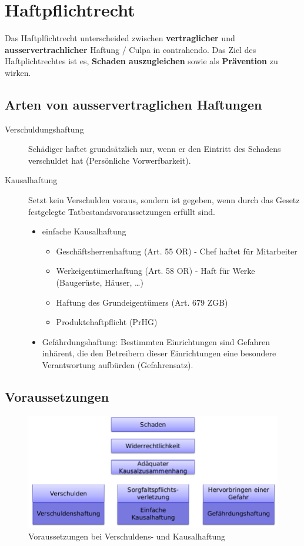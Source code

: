 \section{Haftpflichtrecht}

Das Haftplfichtrecht unterscheided zwischen \textbf{vertraglicher} und
\textbf{ausservertrachlicher} Haftung / Culpa in contrahendo. Das Ziel des
Haftplichtrechtes ist es, \textbf{Schaden auszugleichen} sowie als
\textbf{Prävention} zu wirken.


\subsection{Arten von ausservertraglichen Haftungen}

\begin{description}
	\item[Verschuldungshaftung] Schädiger haftet grundsätzlich nur, wenn
	er den Eintritt des Schadens verschuldet hat (Persönliche
	Vorwerfbarkeit).
	\item[Kausalhaftung] Setzt kein Verschulden voraus, sondern ist
	gegeben, wenn durch das Gesetz festgelegte Tatbestandsvoraussetzungen
	erfüllt sind.
	\begin{itemize}
		\tightlist
		\item einfache Kausalhaftung
		\begin{itemize}
			\tightlist
			\item Geschäftsherrenhaftung (Art. 55 OR) - Chef haftet für Mitarbeiter
			\item Werkeigentümerhaftung (Art. 58 OR) - Haft für Werke (Baugerüste,
			Häuser, \ldots{})
			\item Haftung des Grundeigentümers (Art. 679 ZGB)
			\item Produktehaftpflicht (PrHG)
		\end{itemize}
		\item Gefährdungshaftung: Bestimmten Einrichtungen sind Gefahren inhärent,
		die den Betreibern dieser Einrichtungen eine besondere Verantwortung
		aufbürden (Gefahrensatz).
	\end{itemize}
\end{description}


\subsection{Voraussetzungen}

\begin{figure}[H]
	\centering
	\includegraphics[width=.8\textwidth]{figures/haftpflichtVerschulden.png}
	\caption{Voraussetzungen bei Verschuldens- und Kausalhaftung}
\end{figure}

